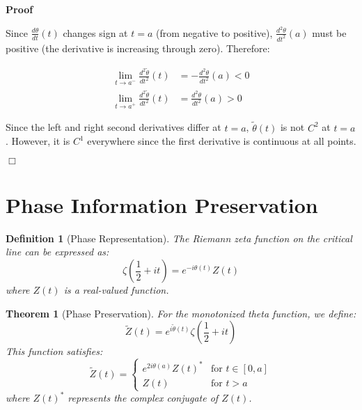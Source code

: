 \documentclass{article}
\newenvironment{proof}{\noindent\textbf{Proof\ }}{\hspace*{\fill}$\Box$\medskip}
\newtheorem{definition}{Definition}
\newtheorem{theorem}{Theorem}
\begin{document}
\begin{proof}
\begin{enumerate}
    Since $\frac{d \theta}{dt} (t)$ changes sign at $t = a$ (from negative to
    positive), $\frac{d^2 \theta}{dt^2} (a)$ must be positive (the derivative
    is increasing through zero). Therefore:
    
    \begin{align}
      \lim_{t \to a^-}  \frac{d^2  \tilde{\theta}}{dt^2} (t) & = - \frac{d^2
      \theta}{dt^2} (a) < 0 \\
      \lim_{t \to a^+}  \frac{d^2  \tilde{\theta}}{dt^2} (t) & = \frac{d^2
      \theta}{dt^2} (a) > 0 
    \end{align}
    
    Since the left and right second derivatives differ at $t = a$,
    $\tilde{\theta} (t)$ is not $C^2$ at $t = a$. However, it is $C^1$
    everywhere since the first derivative is continuous at all points.
  \end{enumerate}
\end{proof}

\section{Phase Information Preservation}

\begin{definition}[Phase Representation]
  The Riemann zeta function on the critical line can be expressed as:
  \begin{equation}
    \zeta \left( \frac{1}{2} + it \right) = e^{- i \theta (t)} Z (t)
  \end{equation}
  where $Z (t)$ is a real-valued function.
\end{definition}

\begin{theorem}[Phase Preservation]
  For the monotonized theta function, we define:
  \begin{equation}
    \tilde{Z} (t) = e^{i \tilde{\theta} (t)} \zeta \left( \frac{1}{2} + it
    \right)
  \end{equation}
  This function satisfies:
  \begin{equation}
    \tilde{Z} (t) = \left\{ \begin{array}{ll}
      e^{2 i \theta (a)} Z (t)^{\ast} & \text{for } t \in [0, a]\\
      Z (t) & \text{for } t > a
    \end{array} \right.
  \end{equation}
  where $Z (t)^{\ast}$ represents the complex conjugate of $Z (t)$.
\end{theorem}
\end{document}
